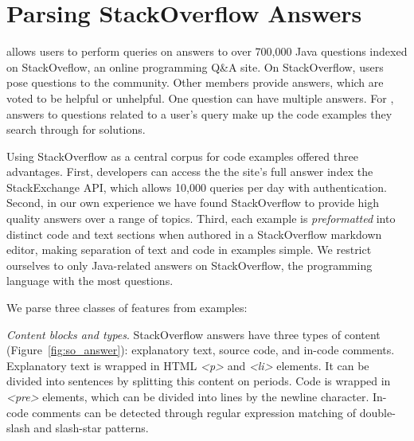 \section{Parsing StackOverflow Answers}

\systemname{} allows users to perform queries on answers to over 700,000 Java questions indexed on StackOveflow, an online programming Q\&A site.
On StackOverflow, users pose questions to the community.
Other members provide answers, which are voted to be helpful or unhelpful.
One question can have multiple answers.
For \systemname{}, answers to questions related to a user's query make up the code examples they search through for solutions.

Using StackOverflow as a central corpus for code examples offered three advantages.
First, developers can access the the site's full answer index the StackExchange API, which allows 10,000 queries per day with authentication.
Second, in our own experience we have found StackOverflow to provide high quality answers over a range of topics.
Third, each example is \emph{preformatted} into distinct code and text sections when authored in a StackOverflow markdown editor, making separation of text and code in examples simple.
We restrict ourselves to only Java-related answers on StackOverflow, the programming language with the most questions.

We parse three classes of features from examples:

\emph{Content blocks and types}. 
StackOverflow answers have three types of content (Figure~\ref{fig:so_answer}): explanatory text, source code, and in-code comments.
Explanatory text is wrapped in HTML \emph{\textless{}p\textgreater{}} and \emph{\textless{}li\textgreater{}} elements.
It can be divided into sentences by splitting this content on periods.
Code is wrapped in \emph{\textless{}pre\textgreater{}} elements, which can be divided into lines by the newline character.
In-code comments can be detected through regular expression matching of double-slash and slash-star patterns.

